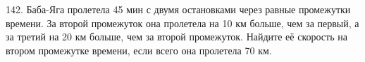 142. Баба-Яга пролетела 45 мин с двумя остановками через равные промежутки времени. За второй промежуток она пролетела на 10 км больше, чем за первый, а за третий на 20 км больше, чем за второй промежуток. Найдите её скорость на втором промежутке времени, если всего она пролетела 70 км.\\

